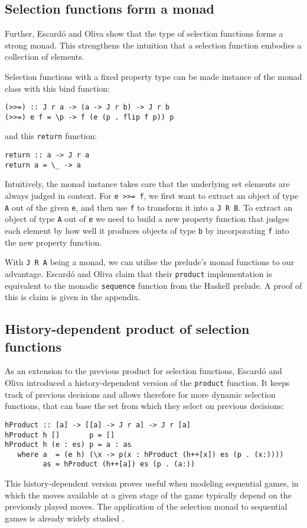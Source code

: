 \documentclass[runningheads]{llncs}
\begin{document}
\subsection{Selection functions form a monad}
Further, Escardó and Oliva show \cite{escardo2010sequential} that the type of selection functions forms a strong monad. This strengthens the intuition that a selection function embodies a collection of elements.

Selection functions with a fixed property type can be made instance of the monad class with this bind function:
\begin{verbatim}
(>>=) :: J r a -> (a -> J r b) -> J r b
(>>=) e f = \p -> f (e (p . flip f p)) p
\end{verbatim}
and this \texttt{return} function:
\begin{verbatim}
return :: a -> J r a
return a = \_ -> a
\end{verbatim}
Intuitively, the monad instance takes care that the underlying set elements are always judged in context. For \texttt{e >>= f}, we first want to extract an object of type \texttt{A} out of the given \texttt{e}, and then use \texttt{f} to transform it into a \texttt{J R B}. To extract an object of type \texttt{A} out of \texttt{e} we need to build a new property function that judges each element by how well it produces objects of type \texttt{b} by incorporating \texttt{f} into the new property function.

With \texttt{J R A} being a monad, we can utilise the prelude's monad functions to our advantage. Escardó and Oliva claim \cite{escardo2010sequential} that their \texttt{product} implementation is equivalent to the monadic \texttt{sequence} function from the Haskell prelude. A proof of this is claim is given in the appendix.
%
%
%
\subsection{History-dependent product of selection functions}
As an extension to the previous product for selection functions, Escardó and Oliva introduced  \cite{escardo2010sequential} a history-dependent version of the \texttt{product} function. It keeps track of previous decisions and allows therefore for more dynamic selection functions, that can base the set from which they select on previous decisions:
\begin{verbatim}
hProduct :: [a] -> [[a] -> J r a] -> J r [a]
hProduct h []       p = []
hProduct h (e : es) p = a : as 
   where a  = (e h) (\x -> p(x : hProduct (h++[x]) es (p . (x:))))
         as = hProduct (h++[a]) es (p . (a:))
\end{verbatim}
This history-dependent version proves useful when modeling sequential games, in which the moves available at a given stage of the game typically depend on the previously played moves.
The application of the selection monad to sequential games is already widely studied  \cite{bolt2018sequential,escardo2010selection,escardo2010sequential,escardo2011sequential,hedges2015selection,hedges2016towards}.
\end{document}
